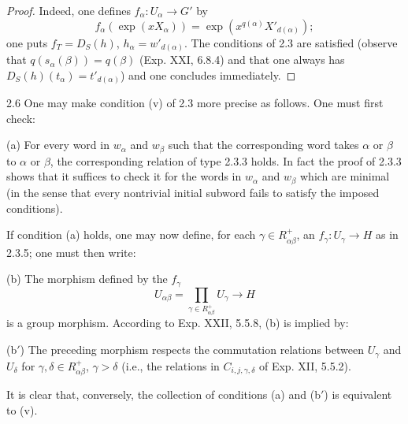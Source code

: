 \begin{proof}
Indeed, one defines $f_\alpha:U_\alpha\to G'$ by
\[
f_\alpha(\exp(xX_\alpha))=\exp(x^{q(\alpha)}X'_{d(\alpha)});
\]
one puts $f_T=D_S(h)$, $h_\alpha=w'_{d(\alpha)}$. The conditions of 2.3 are satisfied (observe that $q(s_\alpha(\beta))=q(\beta)$ (Exp. XXI, 6.8.4) and that one always has $D_S(h)(t_\alpha)=t'_{d(\alpha)}$) and one concludes immediately.
\end{proof}
\begin{remark}{2.6}\label{XXIII.2.6}
One may make condition (v) of 2.3 more precise as follows. One must first check:

(a) For every word in $w_\alpha$ and $w_\beta$ such that the corresponding word takes $\alpha$ or $\beta$ to $\alpha$ or $\beta$, the corresponding relation of type 2.3.3 holds. In fact the proof of 2.3.3 shows that it suffices to check it for the words in $w_\alpha$ and $w_\beta$ which are minimal (in the sense that every nontrivial initial subword fails to satisfy the imposed conditions).

If condition (a) holds, one may now define, for each $\gamma\in R^+_{\alpha\beta}$, an $f_\gamma:U_\gamma\to H$ as in 2.3.5; one must then write:

(b) The morphism defined by the $f_\gamma$
\[
U_{\alpha\beta}=\prod_{\gamma\in R^+_{\alpha\beta}}U_\gamma\to H
\]
is a group morphism. According to Exp. XXII, 5.5.8, (b) is implied by:

(b$'$) The preceding morphism respects the commutation relations between $U_\gamma$ and $U_\delta$ for $\gamma,\delta\in R^+_{\alpha\beta}$, $\gamma>\delta$ (i.e., the relations in $C_{i,j,\gamma,\delta}$ of Exp. XII, 5.5.2).

It is clear that, conversely, the collection of conditions (a) and (b$'$) is equivalent to (v).


\end{remark}
